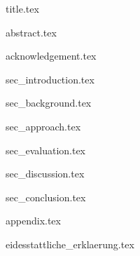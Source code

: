 \documentclass[12pt,a4paper]{article}
\begin{document}
{title.tex}

\clearpage
{abstract.tex}


\clearpage
{acknowledgement.tex}


\clearpage
\tableofcontents


\clearpage
\listoffigures


\clearpage
\listoftables


\newpage
{}
{sec_introduction.tex}


\clearpage
{sec_background.tex}


\clearpage
{sec_approach.tex}


\clearpage
{sec_evaluation.tex}


\clearpage
{sec_discussion.tex}


\clearpage
{sec_conclusion.tex}


\clearpage
{appendix.tex}


\clearpage
%
%
%

{}


\clearpage
{eidesstattliche_erklaerung.tex}
\end{document}
